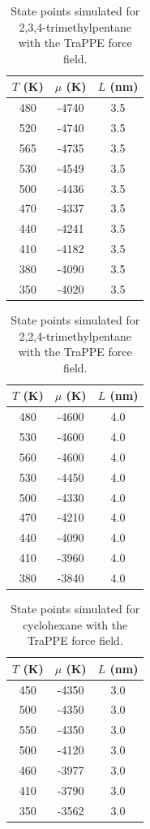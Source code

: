 \documentclass[journal=jctc,manuscript=article]{achemso}
\begin{document}
\begin{table}[htb!]
	\caption{State points simulated for 2,3,4-trimethylpentane with the TraPPE force field.}
	\begin{center}
		\begin{tabular}{|c|c|c|}
			\hline
			$T$ (K) & $\mu$ (K) & $L$ (nm) \\ \hline
			480	&	-4740	&	3.5	\\
			520	&	-4740	&	3.5	\\
			565	&	-4735	&	3.5	\\
			530	&	-4549	&	3.5	\\
			500	&	-4436	&	3.5	\\
			470	&	-4337	&	3.5	\\
			440	&	-4241	&	3.5	\\
			410	&	-4182	&	3.5	\\
			380	&	-4090	&	3.5	\\
			350	&	-4020	&	3.5	\\
			\hline
		\end{tabular}
	\end{center}
\end{table}

\begin{table}[htb!]
	\caption{State points simulated for 2,2,4-trimethylpentane with the TraPPE force field.}
	\begin{center}
		\begin{tabular}{|c|c|c|}
			\hline
			$T$ (K) & $\mu$ (K) & $L$ (nm) \\ \hline
			480	&	-4600	&	4.0	\\
			530	&	-4600	&	4.0	\\
			560	&	-4600	&	4.0	\\
			530	&	-4450	&	4.0	\\
			500	&	-4330	&	4.0	\\
			470	&	-4210	&	4.0	\\
			440	&	-4090	&	4.0	\\
			410	&	-3960	&	4.0	\\
			380	&	-3840	&	4.0	\\
			\hline
		\end{tabular}
	\end{center}
\end{table}

\begin{table}[htb!]
	\caption{State points simulated for cyclohexane with the TraPPE force field.}
	\begin{center}
		\begin{tabular}{|c|c|c|}
			\hline
			$T$ (K) & $\mu$ (K) & $L$ (nm) \\ \hline
			450	&	-4350	&	3.0	\\
			500	&	-4350	&	3.0	\\
			550	&	-4350	&	3.0	\\
			500	&	-4120	&	3.0	\\
			460	&	-3977	&	3.0	\\
			410	&	-3790	&	3.0	\\
			350	&	-3562	&	3.0	\\
			\hline
		\end{tabular}
	\end{center}
\end{table}
\end{document}
